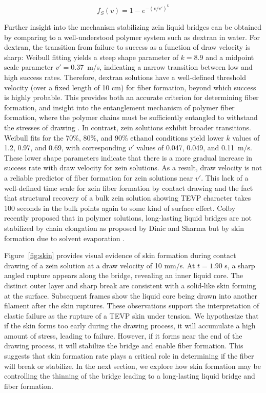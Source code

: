 \documentclass[lineno]{JFM-FLM_Au}
\begin{document}
\begin{equation}
	f_S(v) = 1 - e^{-(v/v')^k}
	\label{eq:weibull}
\end{equation}

Further insight into the mechanism stabilizing zein liquid bridges can be obtained by comparing to a well-understood polymer system such as dextran in water. For dextran, the transition from failure to success as a function of draw velocity is sharp: Weibull fitting yields a steep shape parameter of $k = 8.9$ and a midpoint scale parameter $v' = 0.37$~m/s, indicating a narrow transition between low and high success rates. Therefore, dextran solutions have a well-defined threshold velocity (over a fixed length of 10 cm) for fiber formation, beyond which success is highly probable. This provides both an accurate criterion for determining fiber formation, and insight into the entanglement mechanism of polymer fiber formation, where the polymer chains must be sufficiently entangled to withstand the stresses of drawing \cite{chowdhry_polymer_2021}. In contrast, zein solutions exhibit broader transitions. Weibull fits for the 70\%, 80\%, and 90\% ethanol conditions yield lower $k$ values of 1.2, 0.97, and 0.69, with corresponding $v'$ values of 0.047, 0.049, and 0.11~m/s. These lower shape parameters indicate that there is a more gradual increase in success rate with draw velocity for zein solutions. As a result, draw velocity is not a reliable predictor of fiber formation for zein solutions near $v'$. This lack of a well-defined time scale for zein fiber formation by contact drawing and the fact that structural recovery of a bulk zein solution showing TEVP character takes 100 seconds in the bulk points again to some kind of surface effect. Colby recently proposed that in polymer solutions, long-lasting liquid bridges are not stabilized by chain elongation as proposed by Dinic and Sharma \cite{dinic_macromolecular_2019} but by skin formation due to solvent evaporation \cite{colby_fiber_2023,okuzono_simple_2006}.

Figure~\ref{fig:skin} provides visual evidence of skin formation during contact drawing of a zein solution at a draw velocity of 10 mm/s. At $t = 1.90$ s, a sharp angled rupture appears along the bridge, revealing an inner liquid core. The distinct outer layer and sharp break are consistent with a solid-like skin forming at the surface. Subsequent frames show the liquid core being drawn into another filament after the skin ruptures. These observations support the interpretation of elastic failure as the rupture of a TEVP skin under tension. We hypothesize that if the skin forms too early during the drawing process, it will accumulate a high amount of stress, leading to failure. However, if it forms near the end of the drawing process, it will stabilize the bridge and enable fiber formation. This suggests that skin formation rate plays a critical role in determining if the fiber will break or stabilize. In the next section, we explore how skin formation may be controlling the thinning of the bridge leading to a long-lasting liquid bridge and fiber formation.
\end{document}
